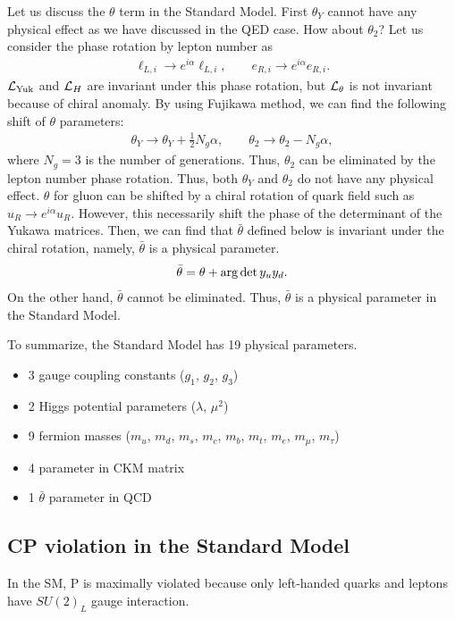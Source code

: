 \documentclass[11pt,a4paper]{article}
\begin{document}
Let us discuss the $\theta$ term in the Standard Model. 
First $\theta_Y$ cannot have any physical effect as we have discussed in the QED case. How about $\theta_2$? Let us consider the phase rotation by lepton number as
\begin{align}
    \ell_{L,i} \to e^{i\alpha} \ell_{L,i}, \qquad
    e_{R,i} \to e^{i\alpha} e_{R,i}.
\end{align}
${\cal L}_{\rm Yuk}$ and ${\cal L}_H$ are invariant under this phase rotation, but ${\cal L}_\theta$ is not invariant because of chiral anomaly. By using Fujikawa method, we can find the following shift of $\theta$ parameters:
\begin{align}
    \theta_Y \to \theta_Y + \frac{1}{2} N_g \alpha, \qquad
    \theta_2 \to \theta_2 -  N_g \alpha,
\end{align}
where $N_g = 3$ is the number of generations.
Thus, $\theta_2$ can be eliminated by the lepton number phase rotation. Thus, both $\theta_Y$ and $\theta_2$ do not have any physical effect.
%
$\theta$ for gluon can be shifted by a chiral rotation of quark field such as $u_R \to e^{i\alpha} u_R$. However, this necessarily shift the phase of the determinant of the Yukawa matrices. Then, we can find that $\bar\theta$ defined below is invariant under the chiral rotation, namely, $\bar\theta$ is a physical parameter.
\begin{align}
    \bar\theta = \theta + {\rm arg} \det y_u y_d.
\end{align}
On the other hand, $\bar\theta$ cannot be eliminated. Thus, $\bar\theta$ is a physical parameter in the Standard Model.

To summarize, the Standard Model has 19 physical parameters.
\begin{itemize}
    \item 3 gauge coupling constants ($g_1$, $g_2$, $g_3$)
    \item 2 Higgs potential parameters ($\lambda$, $\mu^2$)
    \item 9 fermion masses ($m_u$, $m_d$, $m_s$, $m_c$, $m_b$, $m_t$, $m_e$, $m_\mu$, $m_\tau$)
    \item 4 parameter in CKM matrix
    \item 1 $\bar\theta$ parameter in QCD
\end{itemize}

\subsection{CP violation in the Standard Model}
In the SM, P is maximally violated because only left-handed quarks and leptons have $SU(2)_L$ gauge interaction.
\end{document}
